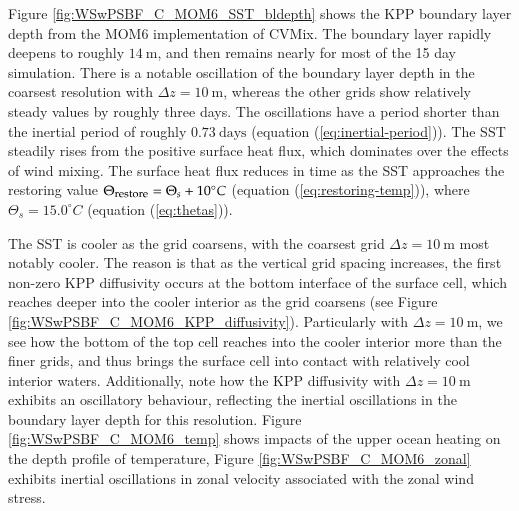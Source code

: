 Figure \ref{fig:WSwPSBF_C_MOM6_SST_bldepth} shows the KPP boundary
layer depth from the MOM6 implementation of CVMix.  The boundary layer
rapidly deepens to roughly $14~\mbox{m}$, and then remains nearly for
most of the 15 day simulation.  There is a notable oscillation of the
boundary layer depth in the coarsest resolution with $\Delta z =
10~\mbox{m}$, whereas the other grids show relatively steady values by
roughly three days.  The oscillations have a period shorter than the
inertial period of roughly $0.73~\mbox{days}$ (equation
(\ref{eq:inertial-period})).  The SST steadily rises from the positive
surface heat flux, which dominates over the effects of wind mixing.
The surface heat flux reduces in time as the SST approaches the
restoring value $\Theta_{\mbox{\footnotesize restore}} = \Theta_s +
10^{\circ}C$ (equation (\ref{eq:restoring-temp})), where $\Theta_s =
15.0^{\circ}C$ (equation (\ref{eq:thetas})). 

The SST is cooler as the grid coarsens, with the coarsest grid $\Delta
z = 10~\mbox{m}$ most notably cooler.  The reason is that as the
vertical grid spacing increases, the first non-zero KPP diffusivity
occurs at the bottom interface of the surface cell, which reaches
deeper into the cooler interior as the grid coarsens (see Figure
\ref{fig:WSwPSBF_C_MOM6_KPP_diffusivity}).  Particularly with $\Delta
z = 10~\mbox{m}$, we see how the bottom of the top cell reaches into
the cooler interior more than the finer grids, and thus brings the
surface cell into contact with relatively cool interior waters.
Additionally, note how the KPP diffusivity with $\Delta z =
10~\mbox{m}$ exhibits an oscillatory behaviour, reflecting the
inertial oscillations in the boundary layer depth for this resolution.
Figure \ref{fig:WSwPSBF_C_MOM6_temp} shows impacts of the upper ocean
heating on the depth profile of temperature, Figure
\ref{fig:WSwPSBF_C_MOM6_zonal} exhibits inertial oscillations in zonal
velocity associated with the zonal wind stress.

